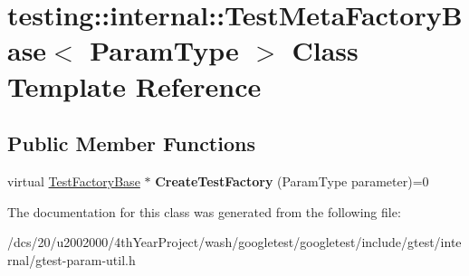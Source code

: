 \hypertarget{classtesting_1_1internal_1_1TestMetaFactoryBase}{}\section{testing\+:\+:internal\+:\+:Test\+Meta\+Factory\+Base$<$ Param\+Type $>$ Class Template Reference}
\label{classtesting_1_1internal_1_1TestMetaFactoryBase}
\subsection*{Public Member Functions}
\begin{DoxyCompactItemize}
\item 
\mbox{\label{classtesting_1_1internal_1_1TestMetaFactoryBase_a853daab362740bcac55e180128d564ef}} 
virtual \mbox{\hyperlink{classtesting_1_1internal_1_1TestFactoryBase}{Test\+Factory\+Base}} $\ast$ {\bfseries Create\+Test\+Factory} (Param\+Type parameter)=0
\end{DoxyCompactItemize}


The documentation for this class was generated from the following file\+:\begin{DoxyCompactItemize}
\item 
/dcs/20/u2002000/4th\+Year\+Project/wash/googletest/googletest/include/gtest/internal/gtest-\/param-\/util.\+h\end{DoxyCompactItemize}
